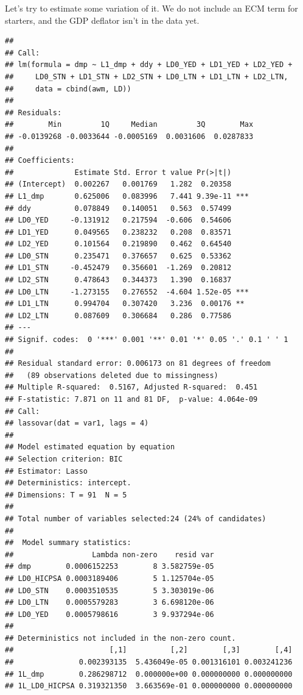 \documentclass[11pt,oneside, a4paper]{amsart}\usepackage[]{graphicx}\usepackage[]{color}
\makeatletter
\newenvironment{kframe}{%
 \def\at@end@of@kframe{}%
 \ifinner\ifhmode%
  \def\at@end@of@kframe{\end{minipage}}%
  \begin{minipage}{\columnwidth}%
 \fi\fi%
 \def\FrameCommand##1{\hskip\@totalleftmargin \hskip-\fboxsep
 \colorbox{shadecolor}{##1}\hskip-\fboxsep
     \hskip-\linewidth \hskip-\@totalleftmargin \hskip\columnwidth}%
 \MakeFramed {\advance\hsize-\width
   \@totalleftmargin\z@ \linewidth\hsize
   \@setminipage}}%
 {\par\unskip\endMakeFramed%
 \at@end@of@kframe}
\newenvironment{knitrout}{}{} %
\makeatother
\begin{document}
Let's try to estimate some variation of it. We do not include an ECM term for starters, and the GDP deflator isn't in the data yet. 
\begin{knitrout}
\color{fgcolor}\begin{kframe}
\begin{verbatim}
## 
## Call:
## lm(formula = dmp ~ L1_dmp + ddy + LD0_YED + LD1_YED + LD2_YED + 
##     LD0_STN + LD1_STN + LD2_STN + LD0_LTN + LD1_LTN + LD2_LTN, 
##     data = cbind(awm, LD))
## 
## Residuals:
##        Min         1Q     Median         3Q        Max 
## -0.0139268 -0.0033644 -0.0005169  0.0031606  0.0287833 
## 
## Coefficients:
##              Estimate Std. Error t value Pr(>|t|)    
## (Intercept)  0.002267   0.001769   1.282  0.20358    
## L1_dmp       0.625006   0.083996   7.441 9.39e-11 ***
## ddy          0.078849   0.140051   0.563  0.57499    
## LD0_YED     -0.131912   0.217594  -0.606  0.54606    
## LD1_YED      0.049565   0.238232   0.208  0.83571    
## LD2_YED      0.101564   0.219890   0.462  0.64540    
## LD0_STN      0.235471   0.376657   0.625  0.53362    
## LD1_STN     -0.452479   0.356601  -1.269  0.20812    
## LD2_STN      0.478643   0.344373   1.390  0.16837    
## LD0_LTN     -1.273155   0.276552  -4.604 1.52e-05 ***
## LD1_LTN      0.994704   0.307420   3.236  0.00176 ** 
## LD2_LTN      0.087609   0.306684   0.286  0.77586    
## ---
## Signif. codes:  0 '***' 0.001 '**' 0.01 '*' 0.05 '.' 0.1 ' ' 1
## 
## Residual standard error: 0.006173 on 81 degrees of freedom
##   (89 observations deleted due to missingness)
## Multiple R-squared:  0.5167,	Adjusted R-squared:  0.451 
## F-statistic: 7.871 on 11 and 81 DF,  p-value: 4.064e-09
## Call:
## lassovar(dat = var1, lags = 4)
## 
## Model estimated equation by equation
## Selection criterion: BIC
## Estimator: Lasso
## Deterministics: intercept.
## Dimensions: T = 91  N = 5
## 
## Total number of variables selected:24 (24% of candidates)
## 
##  Model summary statistics:
##                  Lambda non-zero    resid var
## dmp        0.0006152253        8 3.582759e-05
## LD0_HICPSA 0.0003189406        5 1.125704e-05
## LD0_STN    0.0003510535        5 3.303019e-06
## LD0_LTN    0.0005579283        3 6.698120e-06
## LD0_YED    0.0005798616        3 9.937294e-06
## 
## Deterministics not included in the non-zero count.
##                      [,1]          [,2]        [,3]        [,4]
##               0.002393135  5.436049e-05 0.001316101 0.003241236
## 1L_dmp        0.286298712  0.000000e+00 0.000000000 0.000000000
## 1L_LD0_HICPSA 0.319321350  3.663569e-01 0.000000000 0.000000000

\end{verbatim}
\end{kframe}
\end{knitrout}
\end{document}
